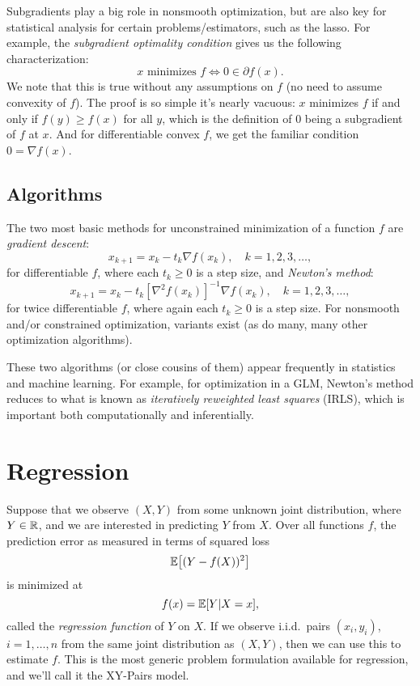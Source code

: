 \documentclass{article}
\begin{document}
Subgradients play a big role in nonsmooth optimization, but are also key for 
statistical analysis for certain problems/estimators, such as the lasso. For
example, the  \emph{subgradient optimality condition} gives us the following 
characterization:
\[
\text{$x$ minimizes $f$} \iff 0 \in \partial f(x).
\]
We note that this is true without any assumptions on $f$ (no need to assume
convexity of $f$). The proof is so simple it's nearly vacuous: $x$ minimizes $f$
if and only if $f(y) \geq f(x)$ for all $y$, which is the definition of 0 being
a subgradient of $f$ at $x$. And for differentiable convex $f$, we get the
familiar condition $0 = \nabla f(x)$.

\subsection{Algorithms}

The two most basic methods for unconstrained minimization of a function $f$ are
\emph{gradient descent}:  
\[
x_{k+1} = x_k - t_k \nabla f(x_k), \quad k=1,2,3,\dots,
\]
for differentiable $f$, where each $t_k \geq 0$ is a step size, and
\emph{Newton's method}: 
\[
x_{k+1} = x_k - t_k [\nabla^2 f(x_k)]^{-1} \nabla f(x_k), \quad k=1,2,3,\dots, 
\]
for twice differentiable $f$, where again each $t_k \geq 0$ is a step size. For
nonsmooth and/or constrained optimization, variants exist (as do many, many
other optimization algorithms). 

These two algorithms (or close cousins of them) appear frequently in statistics
and machine learning. For example, for optimization in a GLM, Newton's method 
reduces to what is known as \emph{iteratively reweighted least squares} (IRLS), 
which is important both computationally and inferentially. 

\section{Regression}

Suppose that we observe $(X,Y)$ from some unknown joint distribution, where $Y
\in \mathbb{R}$, and we are interested in predicting $Y$ from $X$. Over all functions
$f$, the prediction error as measured in terms of squared loss        
\[
\mathbb{E}\big[ (Y - f(X))^2\big]
\]
is minimized at
\[
f(x) = \mathbb{E}[Y | X=x], 
\]  
called the \emph{regression function} of $Y$ on $X$. If we observe i.i.d.\ pairs 
$(x_i,y_i)$, $i=1,\dots,n$ from the same joint distribution as $(X,Y)$, then we
can use this to estimate $f$. This is the most generic problem formulation 
available for regression, and we'll call it the XY-Pairs model.  
\end{document}
